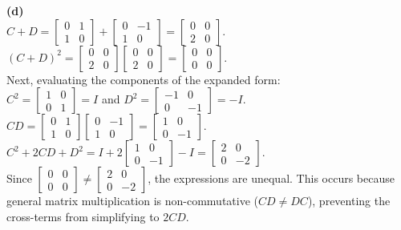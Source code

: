 \begin{solution}
\medskip
\textbf{(d)} \\
$C+D = \begin{bmatrix} 0 & 1 \\ 1 & 0 \end{bmatrix} + \begin{bmatrix} 0 & -1 \\ 1 & 0 \end{bmatrix} = \begin{bmatrix} 0 & 0 \\ 2 & 0 \end{bmatrix}$. \\
$(C+D)^2 = \begin{bmatrix} 0 & 0 \\ 2 & 0 \end{bmatrix} \begin{bmatrix} 0 & 0 \\ 2 & 0 \end{bmatrix} = \begin{bmatrix} 0 & 0 \\ 0 & 0 \end{bmatrix}$. \\
Next, evaluating the components of the expanded form: \\
$C^2 = \begin{bmatrix} 1 & 0 \\ 0 & 1 \end{bmatrix} = I$ and $D^2 = \begin{bmatrix} -1 & 0 \\ 0 & -1 \end{bmatrix} = -I$. \\
$CD = \begin{bmatrix} 0 & 1 \\ 1 & 0 \end{bmatrix} \begin{bmatrix} 0 & -1 \\ 1 & 0 \end{bmatrix} = \begin{bmatrix} 1 & 0 \\ 0 & -1 \end{bmatrix}$. \\
$C^2 + 2CD + D^2 = I + 2\begin{bmatrix} 1 & 0 \\ 0 & -1 \end{bmatrix} - I = \begin{bmatrix} 2 & 0 \\ 0 & -2 \end{bmatrix}$. \\
Since $\begin{bmatrix} 0 & 0 \\ 0 & 0 \end{bmatrix} \neq \begin{bmatrix} 2 & 0 \\ 0 & -2 \end{bmatrix}$, the expressions are unequal. This occurs because general matrix multiplication is non-commutative ($CD \neq DC$), preventing the cross-terms from simplifying to $2CD$.
\end{solution}

